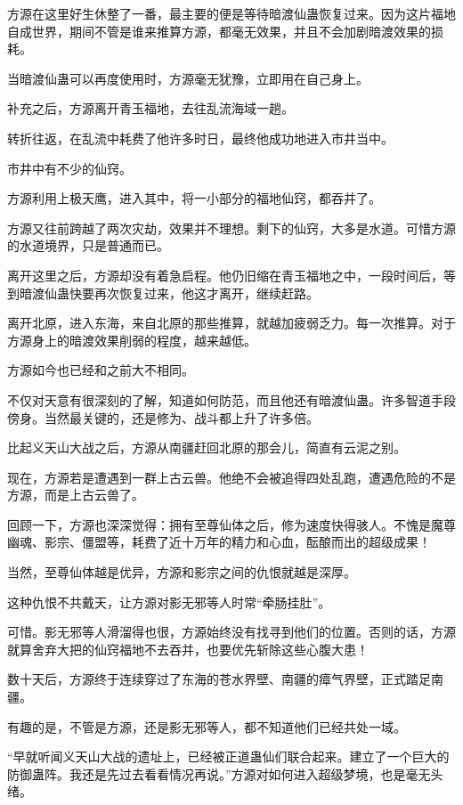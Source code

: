 \begin{this_body}
方源在这里好生休整了一番，最主要的便是等待暗渡仙蛊恢复过来。因为这片福地自成世界，期间不管是谁来推算方源，都毫无效果，并且不会加剧暗渡效果的损耗。

当暗渡仙蛊可以再度使用时，方源毫无犹豫，立即用在自己身上。

补充之后，方源离开青玉福地，去往乱流海域一趟。

转折往返，在乱流中耗费了他许多时日，最终他成功地进入市井当中。

市井中有不少的仙窍。

方源利用上极天鹰，进入其中，将一小部分的福地仙窍，都吞并了。

方源又往前跨越了两次灾劫，效果并不理想。剩下的仙窍，大多是水道。可惜方源的水道境界，只是普通而已。

离开这里之后，方源却没有着急启程。他仍旧缩在青玉福地之中，一段时间后，等到暗渡仙蛊快要再次恢复过来，他这才离开，继续赶路。

离开北原，进入东海，来自北原的那些推算，就越加疲弱乏力。每一次推算。对于方源身上的暗渡效果削弱的程度，越来越低。

方源如今也已经和之前大不相同。

不仅对天意有很深刻的了解，知道如何防范，而且他还有暗渡仙蛊。许多智道手段傍身。当然最关键的，还是修为、战斗都上升了许多倍。

比起义天山大战之后，方源从南疆赶回北原的那会儿，简直有云泥之别。

现在，方源若是遭遇到一群上古云兽。他绝不会被追得四处乱跑，遭遇危险的不是方源，而是上古云兽了。

回顾一下，方源也深深觉得：拥有至尊仙体之后，修为速度快得骇人。不愧是魔尊幽魂、影宗、僵盟等，耗费了近十万年的精力和心血，酝酿而出的超级成果！

当然，至尊仙体越是优异，方源和影宗之间的仇恨就越是深厚。

这种仇恨不共戴天，让方源对影无邪等人时常“牵肠挂肚”。

可惜。影无邪等人滑溜得也很，方源始终没有找寻到他们的位置。否则的话，方源就算舍弃大把的仙窍福地不去吞并，也要优先斩除这些心腹大患！

数十天后，方源终于连续穿过了东海的苍水界壁、南疆的瘴气界壁，正式踏足南疆。

有趣的是，不管是方源，还是影无邪等人，都不知道他们已经共处一域。

“早就听闻义天山大战的遗址上，已经被正道蛊仙们联合起来。建立了一个巨大的防御蛊阵。我还是先过去看看情况再说。”方源对如何进入超级梦境，也是毫无头绪。


\end{this_body}
